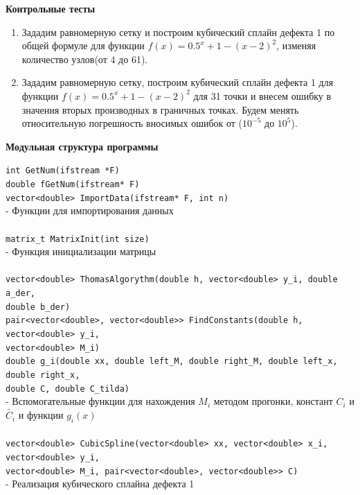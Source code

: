 \documentclass{article}
\begin{document}
	\newpage
	\begin{center} \textbf{Контрольные тесты}\end{center}
	\begin{enumerate}
		\item Зададим равномерную сетку и построим кубический сплайн дефекта 1 по общей формуле для функции $f(x) = 0.5^x + 1 - (x - 2)^2$, изменяя количество узлов(от 4 до 61).
		\item Зададим равномерную сетку, построим кубический сплайн дефекта 1 для функции $f(x) = 0.5^x + 1 - (x - 2)^2$ для 31 точки и внесем ошибку в значения вторых производных в граничных точках. Будем менять относительную погрешность вносимых ошибок от ($10^{-5}$ до $10^5$).
	\end{enumerate}
	\begin{center} \textbf{Модульная структура программы}\end{center}
	\verb|int GetNum(ifstream *F)|\\
	\verb|double fGetNum(ifstream* F)|\\
	\verb|vector<double> ImportData(ifstream* F, int n)|\\
	- Функции для импортирования данных\\
	\\
	\verb|matrix_t MatrixInit(int size)|\\
	- Функция инициализации матрицы\\
	\\
	\verb|vector<double> ThomasAlgorythm(double h, vector<double> y_i, double a_der,|\\ \verb|double b_der)|\\
	\verb|pair<vector<double>, vector<double>> FindConstants(double h, vector<double> y_i,|\\ \verb|vector<double> M_i)|\\
	\verb|double g_i(double xx, double left_M, double right_M, double left_x, double right_x,|\\ \verb|double C, double C_tilda)|\\
	- Вспомогательные функции для нахождения $M_i$ методом прогонки, констант $C_i$ и $\tilde{C_i}$ и функции $g_i(x)$\\
	\\
	\verb|vector<double> CubicSpline(vector<double> xx, vector<double> x_i, vector<double> y_i,|\\ \verb|vector<double> M_i, pair<vector<double>, vector<double>> C)|\\
	- Реализация кубического сплайна дефекта 1\\
\end{document}
